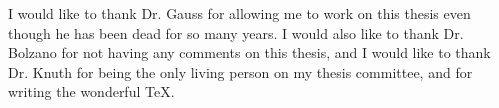 \documentclass{sdsu-thesis}
\begin{document}
\begin{acknowledgements}
I would like to thank Dr. Gauss for allowing me to work on this
thesis even though he has been dead for so many years.  I would also
like to thank Dr. Bolzano for not having any comments on this thesis,
and I would like to thank Dr. Knuth for being the only living person
on my thesis committee, and for writing the wonderful \TeX.
\end{acknowledgements}



%
%
%





%
%
\begin{libraryabstract}

\end{libraryabstract}
\end{document}
